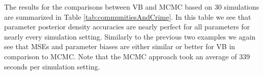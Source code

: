 \documentclass[11pt]{article}
\newtheorem{Main Result}{Main Result}
\begin{document}
	
 
 


The results for the comparisons between VB and MCMC
based on 30 simulations are summarized in Table
\ref{tab:communitiesAndCrime}. In this table we see that
parameter posterior density accuracies are nearly perfect
for all parameters for nearly every simulation setting. Similarly
to the previous two examples we again see that MSEs and
parameter biases are either similar or better for VB in
comparison to MCMC.
Note that the MCMC approach took an average
of 339 seconds per simulation setting.  
\end{document}
